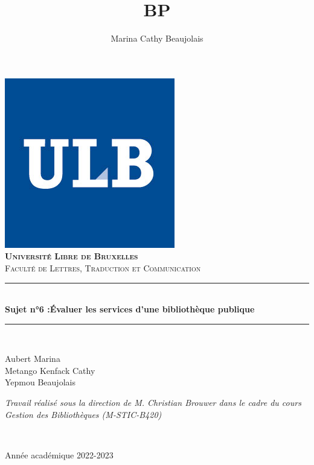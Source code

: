 \documentclass[french,a4paper,12pt]{article}
\title{BP} %
\author{Marina Cathy Beaujolais}
\newcommand{\HRule}{\rule{\linewidth}{0.5mm}}
\begin{document}
\begin{titlepage}
  \begin{sffamily}
  \begin{center}
     \includegraphics[scale=0.25]{logoulb.JPG}~\\[1.5cm]

    \textsc{\bfseries \LARGE Université Libre de Bruxelles }\\[0.5cm]
    \textsc{\Large Faculté de Lettres, Traduction et Communication}\\[6cm]

    \HRule \\[0.4cm]
    { \huge \bfseries Sujet n°6 :​Évaluer les services​ d’une bibliothèque publique\\[0.4cm] }

    \HRule \\[4cm]
    \begin{minipage}{0.4\textwidth}
      \begin{flushleft} \large
        Aubert Marina \\
        Metango Kenfack Cathy \\
        Yepmou Beaujolais \\
        
      \end{flushleft}
    \end{minipage}
    \begin{minipage}{0.4\textwidth}
      \begin{flushright} \large
        \emph{Travail réalisé sous la direction de M. Christian Brouwer dans le cadre du cours Gestion des Bibliothèques (M-STIC-B420)} 
      \end{flushright}
    \end{minipage} \\ [2cm]

    \vfill

    {\large {} Année académique 2022-2023}

  \end{center}
  \end{sffamily}
\end{titlepage}
\end{document}
